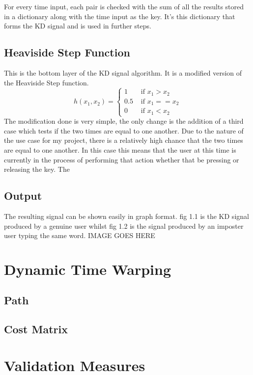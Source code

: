 \documentclass[10pt,a4paper]{report}
\begin{document}
For every time input, each pair is checked with the sum of all the results stored in a dictionary along with the time input as the key. It's this dictionary that forms the KD signal and is used in further steps.

\subsection{Heaviside Step Function}
This is the bottom layer of the KD signal algorithm. It is a modified version of the Heaviside Step function.
\begin{equation}
	h(x_1, x_2) = \begin{cases}
	1 & \text{ if } x_1 > x_2 \\
	0.5 & \text{ if } x_1 == x_2 \\
	0 & \text{ if } x_1 < x_2
\end{cases}
\end{equation}
The modification done is very simple, the only change is the addition of a third case which tests if the two times are equal to one another. Due to the nature of the use case for my project, there is a relatively high chance that the two times are equal to one another. In this case this means that the user at this time is currently in the process of performing that action whether that be pressing or releasing the key. The

\subsection{Output}
The resulting signal can be shown easily in graph format. fig 1.1 is the KD signal produced by a genuine user whilst fig 1.2 is the signal produced by an imposter user typing the same word.
IMAGE GOES HERE

\section{Dynamic Time Warping}
\subsection{Path}
\subsection{Cost Matrix}
\section{Validation Measures}
\end{document}
